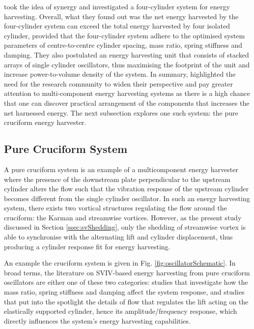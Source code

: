 \documentclass[oneside]{utmthesis}
\begin{document}
\citet{Kim2016} took the idea of synergy and investigated a four-cylinder system for energy harvesting. Overall, what they found out was the net energy harvested by the four-cylinder system can exceed the total energy harvested by four isolated cylinder, provided that the four-cylinder system adhere to the optimised system parameters of centre-to-centre cylinder spacing, mass ratio, spring stiffness and damping. They also postulated an energy harvesting unit that consists of stacked arrays of single cylinder oscillators, thus maximising the footprint of the unit and increase power-to-volume density of the system. In summary, \citet{Kim2016} highlighted the need for the research community to widen their perspective and pay greater attention to multi-component energy harvesting systems as there is a high chance that one can discover practical arrangement of the components that increases the net harnessed energy. The next subsection explores one such system: the pure cruciform energy harvester.

\subsection{Pure Cruciform System} \label{ssec:pureCruciformHarvester}
A pure cruciform \citep{Zou2021} system  is an example of a multicomponent energy harvester where the presence of the downstream plate perpendicular to the upstream cylinder alters the flow such that the vibration response of the upstream cylinder becomes different from the single cylinder oscillator. In such an energy harvesting system, there exists two vortical structures regulating the flow around the cruciform: the Karman and streamwise vortices. However, as the present study discussed in Section \ref{ssec:svShedding}, only the shedding of streamwise vortex is able to synchronise with the alternating lift and cylinder displacement, thus producing a cylinder response fit for energy harvesting.

An example the cruciform system is given in Fig. \ref{fig:oscillatorSchematic}. In broad terms, the literature on SVIV-based energy harvesting from pure cruciform oscillators are either one of these two categories: studies that investigate how the mass ratio, spring stiffness and damping affect the system response, and studies that put into the spotlight the details of flow that regulates the lift acting on the elastically supported cylinder, hence its amplitude/frequency response, which directly influences the system's energy harvesting capabilities.
\end{document}
